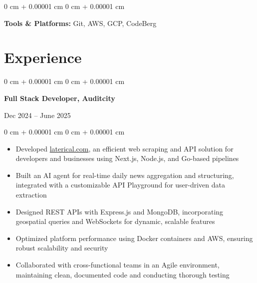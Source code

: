 \documentclass[10pt, letterpaper]{article}
\newenvironment{highlights}{
    \begin{itemize}[
        topsep=0.10 cm,
        parsep=0.10 cm,
        partopsep=0pt,
        itemsep=0pt,
        leftmargin=0 cm + 10pt
    ]
}{
    \end{itemize}
} %
\newenvironment{onecolentry}{
    \begin{adjustwidth}{
        0 cm + 0.00001 cm
    }{
        0 cm + 0.00001 cm
    }
}{
    \end{adjustwidth}
} %
\newenvironment{twocolentry}[2][]{
    \onecolentry
    \def\secondColumn{#2}
    \setcolumnwidth{\fill, 4.5 cm}
    \begin{paracol}{2}
}{
    \switchcolumn \raggedleft \secondColumn
    \end{paracol}
    \endonecolentry
} %
\begin{document}
    \vspace{0.2 cm}

    \begin{onecolentry}
        \textbf{Tools \& Platforms:} Git, AWS, GCP, CodeBerg
    \end{onecolentry}

    \section{Experience}
    \begin{twocolentry}{Dec 2024 -- June 2025}
        \textbf{Full Stack Developer, Auditcity}
    \end{twocolentry}
    \vspace{0.10 cm}
    \begin{onecolentry}
        \begin{highlights}
            \item Developed \href{https://laterical.com}{laterical.com}, an efficient web scraping and API solution for developers and businesses using Next.js, Node.js, and Go-based pipelines
            \item Built an AI agent for real-time daily news aggregation and structuring, integrated with a customizable API Playground for user-driven data extraction
            \item Designed REST APIs with Express.js and MongoDB, incorporating geospatial queries and WebSockets for dynamic, scalable features
            \item Optimized platform performance using Docker containers and AWS, ensuring robust scalability and security
            \item Collaborated with cross-functional teams in an Agile environment, maintaining clean, documented code and conducting thorough testing
        \end{highlights}
    \end{onecolentry}

    \vspace{0.2 cm}
\end{document}
